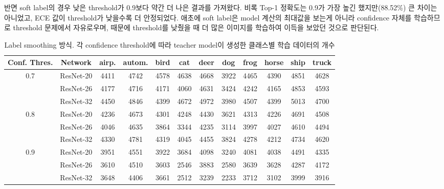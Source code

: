 \documentclass[a4paper, 10pt]{article}
\begin{document}
반면 soft label의 경우 낮은 threshold가 0.9보다 약간 더 나은 결과를 가져왔다.
비록 Top-1 정확도는 0.9가 가장 높긴 했지만(88.52\%) 큰 차이는 아니었고, ECE 값이
threshold가 낮을수록 더 안정되었다. 애초에 soft label은 model 계산의 최대값을
보는게 아니라 confidence 자체를 학습하므로 threshold 문제에서 자유로우며, 때문에
threshold를 낮췄을 때 더 많은 이미지를 학습하여 이득을 보았던 것으로 판단된다.

\begin{table}[!h]
  \center
  \begin{tabular}{|c|c|cccccccccc|}
\hline
Conf. Thres. & Network & airp. & autom. & bird & cat & deer & dog & frog & horse & ship & truck \\ \hline
0.7 & ResNet-20 & 4411 & 4742 & 4578 & 4638 & 4668 & 3922 & 4465 & 4390 & 4851 & 4628 \\
    & ResNet-26 & 4177 & 4716 & 4171 & 4060 & 4631 & 3424 & 4242 & 4165 & 4853 & 4593 \\
    & ResNet-32 & 4450 & 4846 & 4399 & 4672 & 4972 & 3980 & 4507 & 4399 & 5013 & 4700 \\ \hline

0.8 & ResNet-20 & 4236 & 4673 & 4301 & 4248 & 4430 & 3621 & 4313 & 4226 & 4691 & 4508 \\ 
    & ResNet-26 & 4046 & 4635 & 3864 & 3344 & 4235 & 3114 & 3997 & 4027 & 4610 & 4494 \\
    & ResNet-32 & 4330 & 4781 & 4319 & 4045 & 4455 & 3824 & 4278 & 4212 & 4734 & 4620 \\ \hline

0.9 & ResNet-20 & 3951 & 4551 & 3922 & 3684 & 4098 & 3240 & 4081 & 4038 & 4491 & 4335 \\ 
    & ResNet-26 & 3610 & 4510 & 3603 & 2546 & 3883 & 2580 & 3639 & 3628 & 4287 & 4172 \\
    & ResNet-32 & 3648 & 4406 & 3661 & 2512 & 3239 & 2233 & 3712 & 3102 & 3999 & 3916 \\ \hline
  \end{tabular}
  \caption{Label smoothing 방식. 각 confidence threshold에 따라 teacher model이 생성한 클래스별 학습 데이터의 개수}
  \label{datagen_smooth_confidence}
\end{table}
\end{document}
